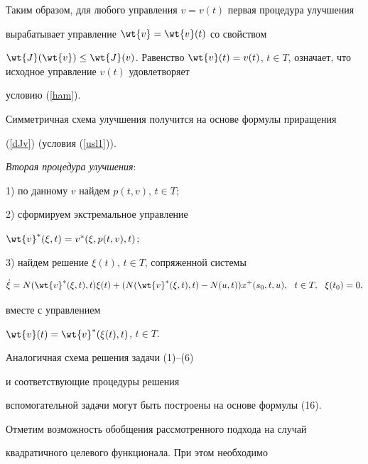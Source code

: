 Таким образом, для любого управления $v=v(t)$ первая процедура улучшения


вырабатывает управление $\wt{v}=\wt{v}(t)$ со свойством


$\wt{J}(\wt{v})\leq \wt{J}(v)$. Равенство $\wt{v}(t)=


v(t)$, $t\in T$, означает, что исходное управление $v(t)$ удовлетворяет


условию (\ref{ham}).





Симметричная схема улучшения получится на основе формулы приращения


(\ref{dJv}) (условия (\ref{usl1})).


\smallskip





{\it Вторая процедура улучшения}\/:





1) по данному $v$ найдем $p(t,v)$, $t\in T$;





2) сформируем экстремальное управление


$\wt{v}^*(\xi,t)=v^*(\xi,p(t,v),t)$;





3) найдем решение $\xi(t)$, $t\in T$, сопряженной системы


$$


\Dot{\xi}=N(\wt{v}^*(\xi,t),t)\xi(t)+(N(\wt{v}^*(\xi,t),t)


-N(u,t))x^+(s_0,t,u),\ \ t\in T, \ \ \xi(t_0)=0,


$$


вместе с управлением


$\wt{v}(t)=\wt{v}^*(\xi(t),t)$, $t\in T$.





Аналогичная схема решения задачи (1)--(6) 


и соответствующие процедуры решения 


вспомогательной задачи могут быть построены на основе формулы (16). 





Отметим возможность обобщения рассмотренного подхода на случай


квадратичного целевого функционала. При этом необходимо


